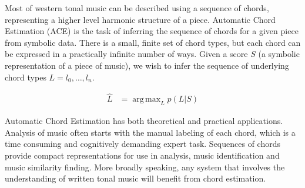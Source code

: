 \documentclass[12pt,a4paper,twoside,openright]{report} \usepackage[pdfborder={0 0 0}]{hyperref}    %
\DeclareMathOperator*{\argmax}{arg\,max} \DeclareMathOperator*{\argmin}{arg\,min}
\theoremstyle{definition} \newtheorem{definition}{Definition}[section]
\begin{document}
    Most of western tonal music can be described using a sequence of chords, representing a higher level harmonic
    structure of a piece. Automatic Chord Estimation (ACE) is the task of inferring the sequence of chords for a given
    piece from symbolic data. There is a small, finite set of chord types, but each chord can be expressed in
    a practically infinite number of ways. Given a score $S$ (a symbolic representation of a piece of music), we wish to
    infer the sequence of underlying chord types $L = l_0, \dots, l_n$. 

    \begin{equation} \begin{aligned} \hat L &= \argmax_L p(L|S) \end{aligned} \end{equation} 
%


    Automatic Chord Estimation has both theoretical and practical applications. 
    Analysis of music often starts with the manual labeling of each chord, which is a time consuming and cognitively
    demanding expert task. Sequences of chords provide compact representations for use in analysis, music identification
    and music similarity finding. More broadly speaking, any system that involves the understanding of written tonal
    music will benefit from chord estimation. 
\end{document}

